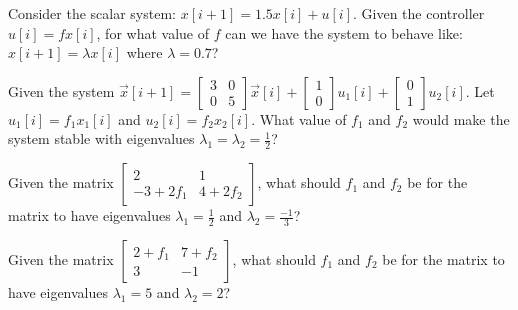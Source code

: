 
\begin{enumerate}

\qitem Consider the scalar system: $x[i+1] = 1.5 x[i] + u[i]$. Given the controller $u[i] = f x[i]$, for what value of $f$ can we have the system to behave like:$x[i+1] = \lambda x[i]$ where $\lambda = 0.7$?



\qitem Given the system $\vec{x}[i+1]  = \left [ \begin{array}{cc} 3&0\\0&5 \end{array}\right] \vec{x}[i] + \left[\begin{array}{c}1\\0 \end{array}\right] u_1[i]+ \left[\begin{array}{c}0\\1 \end{array}\right] u_2[i]$.
Let $u_1[i] = f_1 x_1[i]$ and $u_2[i] = f_2 x_2[i]$. What value of $f_1$ and $f_2$ would make the system stable with eigenvalues $\lambda_1 = \lambda_2 = \frac{1}{2}$?











\qitem Given the matrix $\begin{bmatrix}
2  & 1 \\
-3 + 2f_1 & 4+2f_2
\end{bmatrix}$,
what should $f_1$ and $f_2$ be for the matrix to have eigenvalues $\lambda_1=\frac{1}{2}$ and $\lambda_2=\frac{-1}{3}$?







\qitem Given the matrix $\begin{bmatrix}
2+ f_1  & 7 +f_2 \\
3 & -1
\end{bmatrix}$,
what should $f_1$ and $f_2$ be for the matrix to have eigenvalues $\lambda_1=5$ and $\lambda_2=2$?









\end{enumerate}
